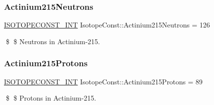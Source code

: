 \subsubsection{\texorpdfstring{Actinium215\+Neutrons}{Actinium215Neutrons}}
{\footnotesize\ttfamily \mbox{\hyperlink{group___isotope_const-_macros_ga5f18360b3e99483a35c32d789e62621c}{I\+S\+O\+T\+O\+P\+E\+C\+O\+N\+S\+T\+\_\+\+I\+NT}} Isotope\+Const\+::\+Actinium215\+Neutrons = 126}

\$ \$ Neutrons in Actinium-\/215. \mbox{\label{group___isotope_const-_actinium-_ac215_ga49849cebbe0cb1c2a1adb8afba600ee3}} 
\subsubsection{\texorpdfstring{Actinium215\+Protons}{Actinium215Protons}}
{\footnotesize\ttfamily \mbox{\hyperlink{group___isotope_const-_macros_ga5f18360b3e99483a35c32d789e62621c}{I\+S\+O\+T\+O\+P\+E\+C\+O\+N\+S\+T\+\_\+\+I\+NT}} Isotope\+Const\+::\+Actinium215\+Protons = 89}

\$ \$ Protons in Actinium-\/215. 